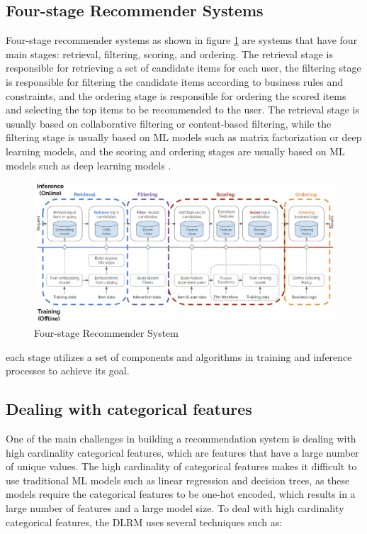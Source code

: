 \subsection{Four-stage Recommender Systems}
Four-stage recommender systems as shown in figure \ref{fig:FourStageRecSys} are systems that have four main stages: retrieval, filtering, scoring, and ordering. 
The retrieval stage is responsible for retrieving a set of candidate items for each user, 
the filtering stage is responsible for filtering the candidate items according to business rules and constraints,
and the ordering stage is responsible for ordering the scored items and selecting the top items to be recommended to the user. 
The retrieval stage is usually based on collaborative filtering or content-based filtering, while the filtering stage is 
usually based on ML models such as matrix factorization or deep learning models, and the scoring and ordering 
stages are usually based on ML models such as deep learning models \cite{NvidiaRecSysBestPractices}.
\begin{figure}[H]
    \centering
    \includegraphics[width=1\textwidth]{assets/Four_stage_rec_sys.png}
    \caption[Four-stage Recommender System]{Four-stage Recommender System\cite{NvidiaRecSysBestPractices}}
    \label{fig:FourStageRecSys}
\end{figure}
each stage utilizes a set of components and algorithms in training and inference processes to achieve its goal.
\subsection{Dealing with categorical features}
One of the main challenges in building a recommendation system is dealing with high cardinality categorical features, which are features that have a large number of unique values. The high cardinality of categorical features makes it difficult to use traditional ML models such as linear regression and decision trees, as these models require the categorical features to be one-hot encoded, which results in a large number of features and a large model size. 
To deal with high cardinality categorical features, the DLRM uses several techniques such as:
